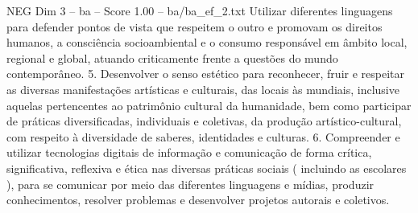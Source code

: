 \begin{textsample}{NEG Dim 3 – ba – Score 1.00 – ba/ba\_ef\_2.txt}
Utilizar diferentes linguagens para defender pontos de vista que respeitem o outro e promovam os direitos humanos, a consciência socioambiental e o consumo responsável em âmbito local, regional e global, atuando criticamente frente a questões do mundo contemporâneo. 5.
Desenvolver o senso estético para reconhecer, fruir e respeitar as diversas manifestações artísticas e culturais, das locais às mundiais, inclusive aquelas pertencentes ao patrimônio cultural da humanidade, bem como participar de práticas diversificadas, individuais e coletivas, da produção artístico-cultural, com respeito à diversidade de saberes, identidades e culturas. 6.
Compreender e utilizar tecnologias digitais de informação e comunicação de forma crítica, significativa, reflexiva e ética nas diversas práticas sociais ( incluindo as escolares ), para se comunicar por meio das diferentes linguagens e mídias, produzir conhecimentos, resolver problemas e desenvolver projetos autorais e coletivos.

\end{textsample}
